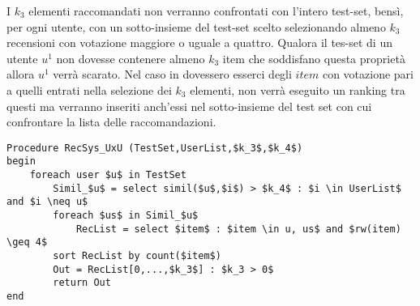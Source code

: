 \documentclass[12pt]{article}
\begin{document}
I $k_3$ elementi raccomandati non verranno confrontati con l'intero test-set, bensì, per ogni utente, con un sotto-insieme del test-set scelto selezionando almeno $k_3$ recensioni con votazione maggiore o uguale a quattro. Qualora il tes-set di un utente $u^1$ non dovesse contenere almeno $k_3$ item che soddisfano questa proprietà allora $u^1$ verrà scarato. Nel caso in dovessero esserci degli $item$ con votazione pari a quelli entrati nella selezione dei $k_3$ elementi, non verrà eseguito un ranking tra questi ma verranno inseriti anch'essi nel sotto-insieme del test set con cui confrontare la lista delle raccomandazioni.

\begin{lstlisting}
Procedure RecSys_UxU (TestSet,UserList,$k_3$,$k_4$)
begin
	foreach user $u$ in TestSet
		Simil_$u$ = select simil($u$,$i$) > $k_4$ : $i \in UserList$ and $i \neq u$
		foreach $us$ in Simil_$u$
			RecList = select $item$ : $item \in u, us$ and $rw(item) \geq 4$
		sort RecList by count($item$)	
		Out = RecList[0,...,$k_3$] : $k_3 > 0$ 
		return Out
end
\end{lstlisting}
\label{sez:Alg1}

%
%
%
\end{document}

